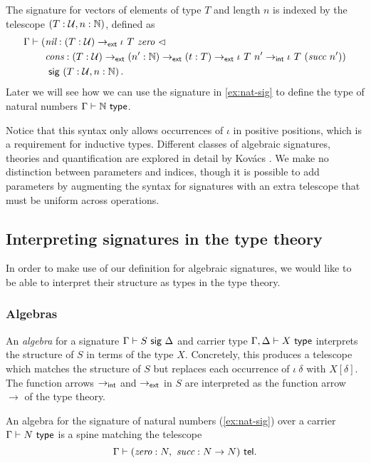 \begin{example}[Vectors]\label{ex:vec-sig}
The signature for vectors of elements of type $T$ and length $n$ is indexed by
the telescope $(T : \mathcal{U}, n : \mathbb{N})$, defined as
\begin{align*}
\Gamma \vdash (&\n{nil} : (T : \univ) \to\external \iota\ T\ \n{zero}\ \lhd \\
&\n{cons} : (T : \univ) \to\external (n' : \mathbb{N}) \to\external (t : T)
\to\external \iota\ T\ n' \to\internal \iota\ T\ (\n{succ}\ n')) \\ &\sig (T :
\univ, n : \mathbb{N}) \,.
\end{align*}
Later we will see how we can use the signature in \cref{ex:nat-sig} to define
the type of natural numbers $\Gamma \vdash \mathbb{N} \ \textsf{type}$.
\end{example}

Notice that this syntax only allows occurrences of $\iota$ in positive
positions, which is a requirement for inductive types. Different classes of
algebraic signatures, theories and quantification are explored in detail by
Kov\'acs \cite{Kovacs2023-gq}. We make no distinction between parameters and
indices, though it is possible to add parameters by augmenting the syntax for
signatures with an extra telescope that must be uniform across operations.

\subsection{Interpreting signatures in the type theory} \label{sub:algebras}

In order to make use of our definition for algebraic signatures, we would like
to be able to interpret their structure as types in the type theory.

\subsubsection{Algebras}

An \emph{algebra} for a signature $\Gamma \vdash S \ \textsf{sig}\  \Delta$ and carrier type
$\Gamma, \Delta \vdash X \ \textsf{type}$ interprets the structure of $S$ in terms of the
type $X$. Concretely, this produces a telescope which matches the structure of
$S$ but replaces each occurrence of $\iota\ \delta$ with $X[\delta]$. The
function arrows $\to_{\textsf{int}}$ and $\to_{\textsf{ext}}$ in $S$ are interpreted as the
function arrow $\to$ of the type theory.

\begin{example}\label{ex:nat-alg}
An algebra for the signature of natural numbers (\cref{ex:nat-sig}) over a carrier $\Gamma \vdash N \ \textsf{type}$ is a spine matching
the telescope \[\Gamma \vdash (\textit{zero}: N,\ \textit{succ}: N \to N) \ \textsf{tel}.\]
\end{example}

